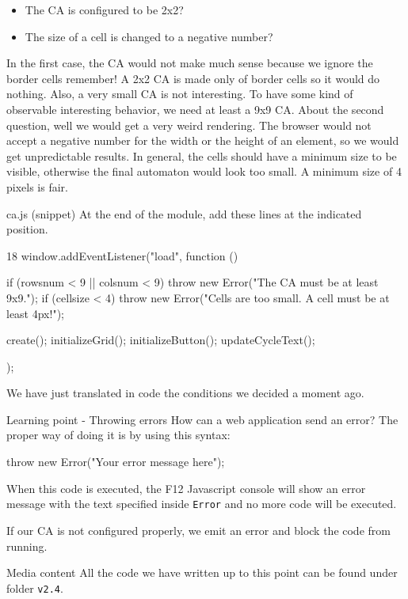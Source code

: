 \begin{itemize}
\item The CA is configured to be 2x2?
\item The size of a cell is changed to a negative number?
\end{itemize}

In the first case, the CA would not make much sense because we ignore the border cells remember! A 2x2 CA
is made only of border cells so it would do nothing. Also, a very small CA is not interesting. To have some
kind of observable interesting behavior, we need at least a 9x9 CA. About the second question, well we would
get a very weird rendering. The browser would not accept a negative number for the width or the height of
an element, so we would get unpredictable results. In general, the cells should have a minimum size to be
visible, otherwise the final automaton would look too small. A minimum size of 4 pixels is fair.

\begin{programcode}{ca.js (snippet)}
At the end of the module, add these lines at the indicated position.
\begin{codeh1}{1}{8}
window.addEventListener("load", function () {
  if (rowsnum < 9 || colsnum < 9) {
    throw new Error("The CA must be at least 9x9.");
  }
  if (cellsize < 4) {
    throw new Error("Cells are too small. A cell must be at least 4px!");
  }

  create();
  initializeGrid();
  initializeButton();
  updateCycleText();
});
\end{codeh1}
\end{programcode}

We have just translated in code the conditions we decided a moment ago.

\begin{tips}{Learning point - Throwing errors}
How can a web application send an error? The proper way of doing it is by using this syntax:
\begin{code}
throw new Error("Your error message here");
\end{code}
When this code is executed, the F12 Javascript console will show an error message with the text
specified inside \texttt{Error} and no more code will be executed.
\end{tips}

If our CA is not configured properly, we emit an error and block the code from running.

\begin{trailer}{Media content}
All the code we have written up to this point can be found under folder \texttt{v2.4}.
\end{trailer}

